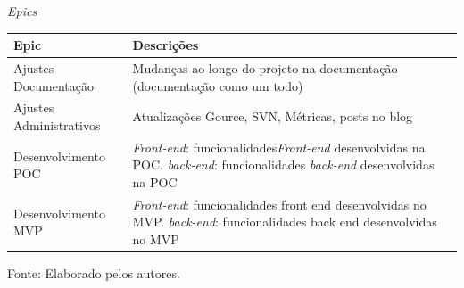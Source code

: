 \documentclass[
    12pt,               %
    openright,          %
    oneside,
    a4paper,            %
    BIBLATEX,           %
    TODO,               %
    english,            %
    brazil              %
    ]{ifsp-spo-inf-ctds}
\begin{document}

 \begin{center}
      \begin{quadro}[H]
      \centering
          \caption{\emph{Epics}}
          \begin{tabulary}{1.0\textwidth}{|p{12em}|p{25em}|}
        \hline
       Epic & Descrições  \\
        \hline
        Ajustes Documentação & Mudanças ao longo do projeto na documentação (documentação como um todo)\\
        \hline
        Ajustes Administrativos & Atualizações Gource, SVN, Métricas, posts no blog\\
        \hline
        Desenvolvimento POC &\emph{Front-end}: funcionalidades\emph{Front-end} desenvolvidas na POC.
        \emph{back-end}: funcionalidades \emph{back-end} desenvolvidas na POC\\
        \hline
        Desenvolvimento MVP &\emph{Front-end}: funcionalidades front end desenvolvidas no MVP.
      \emph{back-end}: funcionalidades back end desenvolvidas no MVP\\
        \hline
        \end{tabulary}
          \label{qd: epic}
          \centering
         { \footnotesize Fonte: Elaborado pelos autores.}
      \end{quadro}
    \end{center} 
\end{document}
